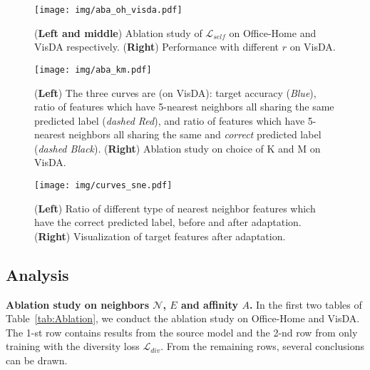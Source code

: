 \documentclass{article}
\begin{document}
\begin{figure*}[t]
	\centering
	\texttt{[image: img/aba\_oh\_visda.pdf]}
	\vspace{-2mm}
	\caption{(\textbf{Left and middle}) Ablation study of $\mathcal{L}_{self}$ on Office-Home and VisDA respectively. (\textbf{Right}) Performance with different $r$ on VisDA. \vspace{-2mm}}
	\label{fig:abas}
	\vspace{-2mm}
\end{figure*}


\begin{figure*}[t]
	\centering
	\texttt{[image: img/aba\_km.pdf]}
	\vspace{-2mm}
	\caption{(\textbf{Left}) The three curves are (on VisDA): target accuracy (\textit{Blue}), ratio of features which have 5-nearest neighbors all sharing the same predicted label (\textit{dashed Red}), and ratio of features which have 5-nearest neighbors all sharing the same and \textit{correct} predicted label (\textit{dashed Black}). (\textbf{Right}) Ablation study on choice of K and M on VisDA. \vspace{-2mm}}
	\label{fig:curve_km}
	\vspace{-2mm}
\end{figure*}







\begin{figure*}[bpt]
	\centering
\texttt{[image: img/curves\_sne.pdf]}
	\vspace{-2mm}
	\caption{(\textbf{Left}) Ratio of different type of nearest neighbor features which have the correct predicted label, before and after adaptation. (\textbf{Right}) Visualization of target features after adaptation.\vspace{-2mm}}
	\label{fig:curves_sne}
	\vspace{-2mm}
\end{figure*}


\subsection{Analysis}

\noindent \textbf{Ablation study on neighbors $\mathcal{N}$, $E$ and affinity $A$.} In the first two tables of Table~\ref{tab:Ablation}, we conduct the ablation study on Office-Home and VisDA. The 1-st row contains results from the source model and the 2-nd row from only training with the diversity loss $\mathcal{L}_{div}$. From the remaining rows, several conclusions can be drawn.
\end{document}
